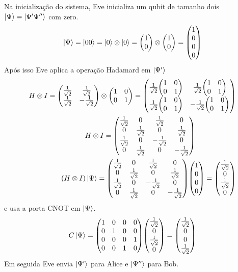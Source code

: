 \documentclass[a4paper, 12pt, oneside]{book}
\begin{document}
Na inicialização do sistema, Eve inicializa um qubit de tamanho dois $\ket{\Psi}=\ket{\Psi' \Psi''}$ com zero. 
\begin{equation}
\ket{\Psi} = \ket{00} = \ket{0}\otimes \ket{0} = \mqty(1\\0) \otimes \mqty(1\\0) = \mqty(1\\0\\0\\0)
\end{equation}
Após isso Eve aplica a operação Hadamard em $\ket{\Psi'}$
\begin{align}
H \otimes I = \mqty(\frac{1}{\sqrt{2}}&\frac{1}{\sqrt{2}}\\
				\frac{1}{\sqrt{2}}&-\frac{1}{\sqrt{2}} ) 
	\otimes \mqty(1&0\\0&1) 
= \mqty(\frac{1}{\sqrt{2}}\mqty(1&0\\0&1) & \frac{1}{\sqrt{2}}\mqty(1&0\\0&1) \\ 
	\frac{1}{\sqrt{2}}\mqty(1&0\\0&1) & -\frac{1}{\sqrt{2}}\mqty(1&0\\0&1))
	\\
H \otimes I = 
\mqty(\frac{1}{\sqrt{2}}&0&\frac{1}{\sqrt{2}}&0\\
	0&\frac{1}{\sqrt{2}}&0&\frac{1}{\sqrt{2}} \\
	\frac{1}{\sqrt{2}}&0&-\frac{1}{\sqrt{2}}&0 \\
	0&\frac{1}{\sqrt{2}}&0&-\frac{1}{\sqrt{2}}) \hspace{2cm} \\
(H \otimes I)\ket{\Psi} =  \mqty(\frac{1}{\sqrt{2}}&0&\frac{1}{\sqrt{2}}&0\\
	0&\frac{1}{\sqrt{2}}&0&\frac{1}{\sqrt{2}} \\
	\frac{1}{\sqrt{2}}&0&-\frac{1}{\sqrt{2}}&0 \\
	0&\frac{1}{\sqrt{2}}&0&-\frac{1}{\sqrt{2}}) 
	\mqty(1\\0\\0\\0) = \mqty(\frac{1}{\sqrt{2}}\\0\\ \frac{1}{\sqrt{2}}\\0)
\end{align}
e usa a porta CNOT em $\ket{\Psi}$.
\begin{equation}
C\ket{\Psi} = \mqty(1&0&0&0\\0&1&0&0\\0&0&0&1\\0&0&1&0) 
			\mqty(\frac{1}{\sqrt{2}}\\0\\ \frac{1}{\sqrt{2}}\\0)
		= \mqty(\frac{1}{\sqrt{2}}\\0\\ 0\\ \frac{1}{\sqrt{2}})
\end{equation}
Em seguida Eve envia $\ket{\Psi'}$ para Alice e $\ket{\Psi''}$ para Bob. 
\end{document}
